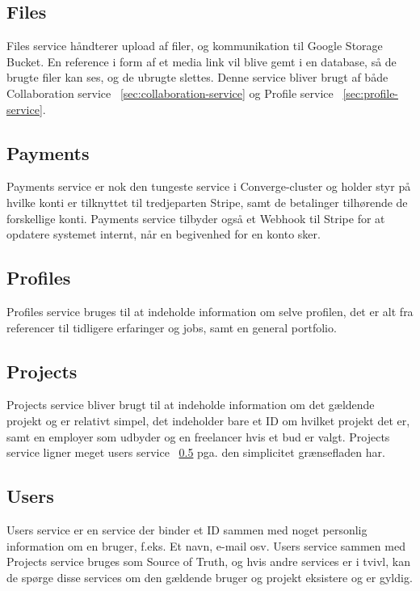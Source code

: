 \subsection{Files}
\label{sec:files-service}

Files service håndterer upload af filer, og kommunikation til Google Storage Bucket. En reference i form af et media link vil blive gemt i en database, så de brugte filer kan ses, og de ubrugte slettes. Denne service bliver brugt af både Collaboration  service  ~\ref{sec:collaboration-service} og Profile service ~\ref{sec:profile-service}.

\subsection{Payments}
\label{sec:payments-service}

Payments service er nok den tungeste service i Converge-cluster og holder styr på hvilke konti er tilknyttet til tredjeparten Stripe, samt de betalinger tilhørende de forskellige konti. Payments service tilbyder også et Webhook til Stripe for at opdatere systemet internt, når en begivenhed for en konto sker.

\subsection{Profiles}
\label{sec:profiles-service}

Profiles service bruges til at indeholde information om selve profilen, det er alt fra referencer til tidligere erfaringer og jobs, samt en general portfolio.

\subsection{Projects}
\label{sec:projects-service}

Projects service bliver brugt til at indeholde information om det gældende projekt og er relativt simpel, det indeholder bare et ID om hvilket projekt det er, samt en employer som udbyder og en freelancer hvis et bud er valgt. Projects service ligner meget users service  ~\ref{sec:users-service} pga. den simplicitet grænsefladen har.

\subsection{Users}
\label{sec:users-service}

Users service er en service der binder et ID sammen med noget personlig information om en bruger, f.eks. Et navn, e-mail osv. Users service sammen med Projects service bruges som Source of Truth, og hvis andre services er i tvivl, kan de spørge disse services om den gældende bruger og projekt eksistere og er gyldig.

